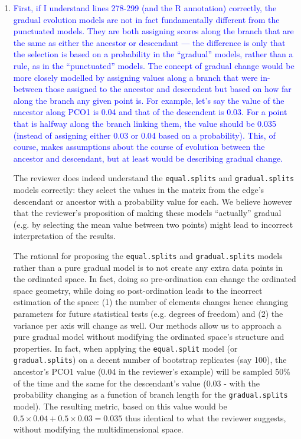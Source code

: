 \documentclass[12pt,letterpaper]{article}
\begin{document}
\begin{enumerate}

\item{\textcolor{blue}{First, if I understand lines 278-299 (and the R annotation) correctly, the gradual evolution models are not in fact fundamentally different from the punctuated models. They are both assigning scores along the branch that are the same as either the ancestor or descendant — the difference is only that the selection is based on a probability in the ``gradual'' models, rather than a rule, as in the ``punctuated'' models. The concept of gradual change would be more closely modelled by assigning values along a branch that were in-between those assigned to the ancestor and descendent but based on how far along the branch any given point is. For example, let's say the value of the ancestor along PCO1 is 0.04 and that of the descendent is 0.03. For a point that is halfway along the branch linking them, the value should be 0.035 (instead of assigning either 0.03 or 0.04 based on a probability). This, of course, makes assumptions about the course of evolution between the ancestor and descendant, but at least would be describing gradual change.}}

The reviewer does indeed understand the \texttt{equal.splits} and \texttt{gradual.splits} models correctly: they select the values in the matrix from the edge's descendant or ancestor with a probability value for each.
We believe however that the reviewer's proposition of making these models ``actually'' gradual (e.g. by selecting the mean value between two points) might lead to incorrect interpretation of the results.

The rational for proposing the \texttt{equal.splits} and \texttt{gradual.splits} models rather than a pure gradual model is to not create any extra data points in the ordinated space.
In fact, doing so pre-ordination can change the ordinated space geometry, while doing so post-ordination leads to the incorrect estimation of the space: (1) the number of elements changes hence changing parameters for future statistical tests (e.g. degrees of freedom) and (2) the variance per axis will change as well.
Our methods allow us to approach a pure gradual model without modifying the ordinated space's structure and properties.
In fact, when applying the \texttt{equal.split} model (or \texttt{gradual.splits}) on a decent number of bootstrap replicates (say 100), the ancestor's PCO1 value (0.04 in the reviewer's example) will be sampled 50\% of the time and the same for the descendant's value (0.03 - with the probability changing as a function of branch length for the \texttt{gradual.splits} model).
The resulting metric, based on this value would be $0.5\times0.04 + 0.5\times0.03 = 0.035$ thus identical to what the reviewer suggests, without modifying the multidimensional space.


\end{enumerate}
\end{document}
